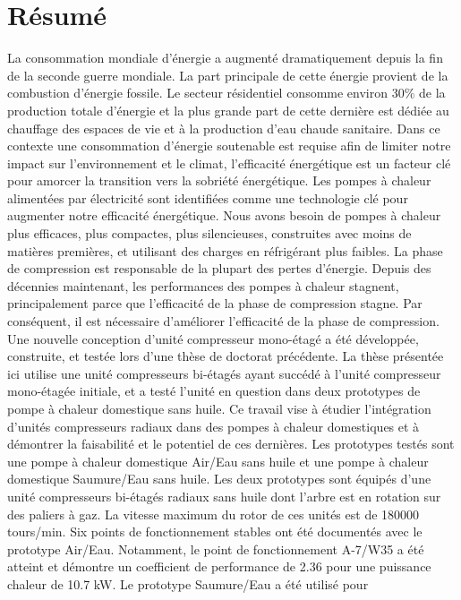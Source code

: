 \chapter{Résumé}
\label{chap:resume}

La consommation mondiale d'énergie a augmenté dramatiquement depuis la
fin de la seconde guerre mondiale. La part principale de cette énergie
provient de la combustion d'énergie fossile. Le secteur résidentiel
consomme environ 30\% de la production totale d'énergie et la plus
grande part de cette dernière est dédiée au chauffage des espaces de
vie et à la production d'eau chaude sanitaire. Dans ce contexte une
consommation d'énergie soutenable est requise afin de limiter notre
impact sur l'environnement et le climat, l'efficacité énergétique est
un facteur clé pour amorcer la transition vers la sobriété
énergétique. Les pompes à chaleur alimentées par électricité sont
identifiées comme une technologie clé pour augmenter notre efficacité
énergétique. Nous avons besoin de pompes à chaleur plus efficaces,
plus compactes, plus silencieuses, construites avec moins de matières
premières, et utilisant des charges en réfrigérant plus faibles. La
phase de compression est responsable de la plupart des pertes
d'énergie. Depuis des décennies maintenant, les performances des
pompes à chaleur stagnent, principalement parce que l'efficacité de la
phase de compression stagne. Par conséquent, il est nécessaire
d'améliorer l'efficacité de la phase de compression. Une nouvelle
conception d'unité compresseur mono-étagé a été développée,
construite, et testée lors d'une thèse de doctorat précédente. La
thèse présentée ici utilise une unité compresseurs bi-étagés ayant
succédé à l'unité compresseur mono-étagée initiale, et a testé l'unité
en question dans deux prototypes de pompe à chaleur domestique sans
huile. Ce travail vise à étudier l'intégration d'unités compresseurs
radiaux dans des pompes à chaleur domestiques et à démontrer la
faisabilité et le potentiel de ces dernières. Les prototypes testés
sont une pompe à chaleur domestique Air/Eau sans huile et une pompe à
chaleur domestique Saumure/Eau sans huile. Les deux prototypes sont
équipés d'une unité compresseurs bi-étagés radiaux sans huile dont
l'arbre est en rotation sur des paliers à gaz. La vitesse maximum du
rotor de ces unités est de 180000 tours/min. Six points de
fonctionnement stables ont été documentés avec le prototype
Air/Eau. Notamment, le point de fonctionnement A-7/W35 a été atteint
et démontre un coefficient de performance de 2.36 pour une puissance
chaleur de 10.7 kW. Le prototype Saumure/Eau a été utilisé pour
